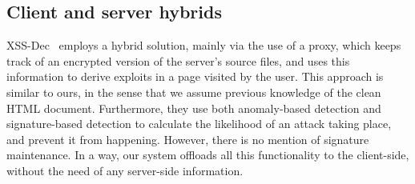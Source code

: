 \subsection{Client and server hybrids}

XSS-Dec~\cite{Sundareswaran:2012:XHS:2352970.2352994} employs a hybrid solution, mainly via the use of a proxy, which keeps track of an encrypted version of the server's source files, and uses this information to derive exploits in a page visited by the user. This approach is similar to ours, in the sense that we assume previous knowledge of the clean HTML document. Furthermore, they use both anomaly-based detection and signature-based detection to calculate the likelihood of an attack taking place, and prevent it from happening. However, there is no mention of signature maintenance. In a way, our system offloads all this functionality to the client-side, without the need of any server-side information.

